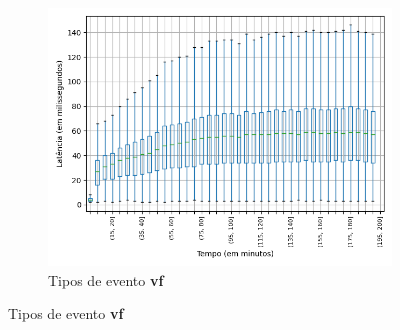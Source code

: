 \begin{figure}
\centering
\begin{subfigure}{.5\textwidth}
\centering
\includegraphics[width=\textwidth]{figuras/graphics/boxplot_6-dez-is_vf.png}
\caption{Tipos de evento \textbf{vf}}
\label{fig:BoxPlot_vf_IS_1}
\end{subfigure}%


\end{figure}
